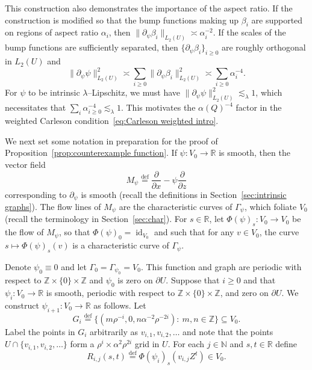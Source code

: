 \documentclass[11pt,reqno]{amsart}
\newcommand{\N}{\mathbb{N}}
\newcommand{\R}{\mathbb{R}}
\newcommand{\Z}{\mathbb{Z}}
\renewcommand{\approx}{\asymp}
\newcommand{\0}{\mathbf{0}}
\renewcommand{\1}{\mathbf 1}
\newcommand{\from}{\colon}
\renewcommand{\subset}{\subseteq}
\newcommand{\eqdef}{\stackrel{\mathrm{def}}{=}}
\renewcommand{\ge}{\geqslant}
\theoremstyle{remark}
\DeclareMathOperator{\id}{id}
\begin{document}

This construction also demonstrates the importance of the aspect ratio.  If the construction is modified so that the bump functions making up $\beta_i$ are supported on regions of aspect ratio $\alpha_i$, then $\|\partial_\psi \beta_i\|_{L_2(U)}\approx \alpha_i^{-2}$.  If the scales of the bump functions are sufficiently separated, then $\{\partial_\psi \beta_i\}_{i\ge 0}$ are roughly orthogonal in $L_2(U)$ and
$$\|\partial_\psi \psi\|_{L_2(U)}^2\approx \sum_{i\ge 0} \|\partial_\psi \beta_i\|_{L_2(U)}^2\approx \sum_{i\ge 0} \alpha_i^{-4}.$$
For $\psi$ to be intrinsic $\lambda$--Lipschitz, we must have $\|\partial_\psi \psi\|_{L_2(U)}^2\lesssim_\lambda 1$, which necessitates that $\sum_i \alpha_{i\ge 0}^{-4}\lesssim_\lambda 1$. This motivates the $\alpha(Q)^{-4}$ factor in the weighted Carleson condition~\eqref{eq:Carleson weighted intro}.

We next set some notation in preparation for the proof of Proposition~\ref{prop:counterexample function}.  If $\psi\from V_0\to \R$ is smooth, then the vector field $$M_\psi\eqdef \frac{\partial}{\partial x}-\psi \frac{\partial}{\partial z}$$ corresponding to $\partial_\psi$ is smooth (recall the definitions in Section~\ref{sec:intrinsic graphs}).  The flow lines of $M_\psi$ are the characteristic curves of $\Gamma_\psi$, which foliate $V_0$ (recall the terminology in Section~\ref{sec:char}).  For $s\in \R$, let $\Phi(\psi)_s\from V_0\to V_0$ be the flow of $M_\psi$, so that $\Phi(\psi)_0=\id_{V_0}$ and such that for any $v\in V_0$, the curve $s\mapsto \Phi(\psi)_s(v)$ is a characteristic curve of $\Gamma_\psi$.

Denote $\psi_0\equiv 0$ and let $\Gamma_0=\Gamma_{\psi_0}=V_0$. This function and graph are periodic with respect to $\Z\times \{0\}\times \Z$ and $\psi_0$ is zero on $\partial U$. Suppose that $i\ge 0$ and that $\psi_i\from V_0\to \R$ is smooth, periodic with respect to $\Z\times \{0\}\times \Z$, and zero on $\partial U$. We construct $\psi_{i+1}\from V_0\to \R$ as follows. Let
  \begin{equation}\label{eq:grid Gi}
  G_i\eqdef \big\{(m\rho^{-i},0,n\alpha^{-2}\rho^{-2i}):\ m,n\in \Z\big\}\subset V_0.
  \end{equation}
  Label the points in $G_i$ arbitrarily as $v_{i,1},v_{i,2},\ldots$ and note that the points $U\cap \{v_{i,1},v_{i,2},\ldots \}$ form a $\rho^i\times \alpha^2\rho^{2i}$ grid in $U$.  For each $j\in \N$ and $s,t\in \R$ define
\begin{equation}\label{eq:def Rij}
R_{i,j}(s,t)\eqdef \Phi(\psi_i)_s(v_{i,j}Z^t)\in V_0.
\end{equation}
\end{document}
